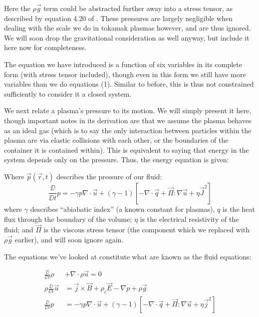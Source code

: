 \begin{remark}
    Here the $\rho \vec{g}$ term could be abstracted further away into a stress tensor, as described by equation 4.20 of \cite{mhd-lectures}. These 
    pressures are largely negligible when dealing with the scale we do in tokamak plasmas however, and 
    are thus ignored. We will soon drop the gravitational consideration as well anyway, but include it here now for completeness.
\end{remark}

\begin{remark}
    The equation we have introduced is a function of six variables in its complete form (with stress tensor 
    included), though even in this form we still have more variables than we do equations (1). Similar to before, this 
    is thus not constrained sufficiently to consider it a closed system.
\end{remark}

We next relate a plasma's pressure to its motion. We will simply present it here, though important notes in its 
derivation are that we assume the plasma behaves as an ideal gas (which is to say the only interaction 
between particles within the plasma are via elastic collisions with each other, or the boundaries of the container 
it is contained within). This is equivalent to saying that energy in the system depends only on the pressure. Thus, the 
energy equation is given:
\begin{definition}
    Where $\vec{p}(\vec{r}, t)$ describes the pressure of our fluid:
    \begin{equation}
        \frac{\DD}{\DD t} p  = -\gamma p \nabla \cdot \vec{u} + (\gamma - 1) \left [ -\nabla \cdot \vec{q} + \vec{\Pi} : \nabla \vec{u} + \eta \vec{J}^2 \right ]
    \end{equation}
    where $\gamma$ describes ``abiabatic index'' (a known constant for plasmas), $q$ is the heat flux through 
    the boundary of the volume; $\eta$ is the electrical resistivity of the fluid; and $\vec{\Pi}$ is the viscous 
    stress tensor (the component which we replaced with $\rho \vec{g}$ earlier), and will soon ignore again. 
\end{definition}



The equations we've looked at constitute what are known as the fluid equations:

\begin{definition}
    \begin{align}
        \frac{\DD}{\DD t} \rho &+ \nabla  \cdot \rho \vec{u} = 0 \\
        \rho \frac{\DD}{\DD t} \vec{u} &=  \vec{j} \times \vec{B} + \rho_c \vec{E} - \nabla p + \rho \vec{g} \\
        \frac{\DD}{\DD t} p  &= -\gamma p \nabla \cdot \vec{u} + (\gamma - 1) \left [ -\nabla \cdot \vec{q} + \vec{\Pi} : \nabla \vec{u} + \eta \vec{j}^2 \right ]
    \end{align}
\end{definition}

